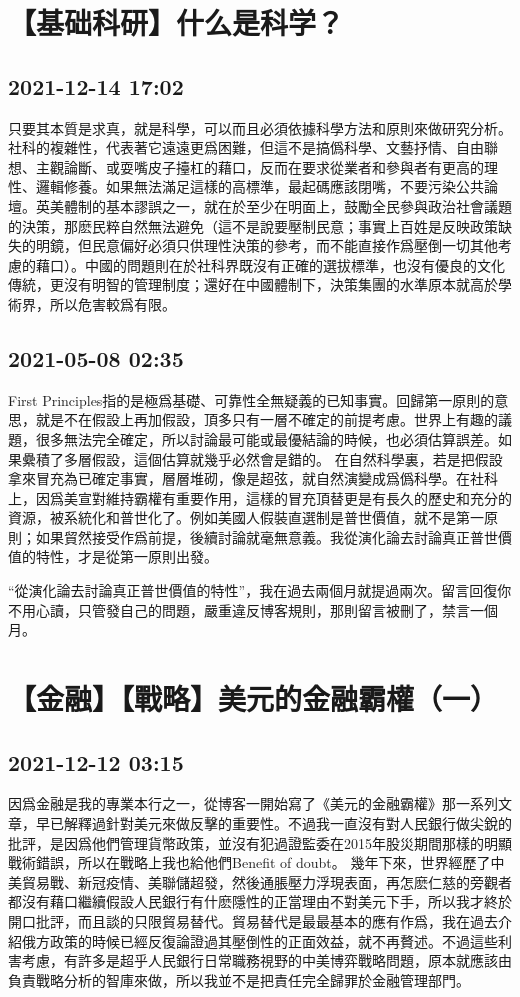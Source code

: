 \documentclass[twocolumn]{ctexart}
\begin{document}
\section*{【基础科研】什么是科学？}
\subsection*{2021-12-14 17:02}

只要其本質是求真，就是科學，可以而且必須依據科學方法和原則來做研究分析。社科的複雜性，代表著它遠遠更爲困難，但這不是搞僞科學、文藝抒情、自由聯想、主觀論斷、或耍嘴皮子擡杠的藉口，反而在要求從業者和參與者有更高的理性、邏輯修養。如果無法滿足這樣的高標準，最起碼應該閉嘴，不要污染公共論壇。英美體制的基本謬誤之一，就在於至少在明面上，鼓勵全民參與政治社會議題的決策，那麽民粹自然無法避免（這不是說要壓制民意；事實上百姓是反映政策缺失的明鏡，但民意偏好必須只供理性決策的參考，而不能直接作爲壓倒一切其他考慮的藉口）。中國的問題則在於社科界既沒有正確的選拔標準，也沒有優良的文化傳統，更沒有明智的管理制度；還好在中國體制下，決策集團的水準原本就高於學術界，所以危害較爲有限。
\subsection*{2021-05-08 02:35}

First Principles指的是極爲基礎、可靠性全無疑義的已知事實。回歸第一原則的意思，就是不在假設上再加假設，頂多只有一層不確定的前提考慮。世界上有趣的議題，很多無法完全確定，所以討論最可能或最優結論的時候，也必須估算誤差。如果纍積了多層假設，這個估算就幾乎必然會是錯的。
在自然科學裏，若是把假設拿來冒充為已確定事實，層層堆砌，像是超弦，就自然演變成爲僞科學。在社科上，因爲美宣對維持霸權有重要作用，這樣的冒充頂替更是有長久的歷史和充分的資源，被系統化和普世化了。例如美國人假裝直選制是普世價值，就不是第一原則；如果貿然接受作爲前提，後續討論就毫無意義。我從演化論去討論真正普世價值的特性，才是從第一原則出發。

“從演化論去討論真正普世價值的特性”，我在過去兩個月就提過兩次。留言回復你不用心讀，只管發自己的問題，嚴重違反博客規則，那則留言被刪了，禁言一個月。
\section*{【金融】【戰略】美元的金融霸權（一）}
\subsection*{2021-12-12 03:15}

因爲金融是我的專業本行之一，從博客一開始寫了《美元的金融霸權》那一系列文章，早已解釋過針對美元來做反擊的重要性。不過我一直沒有對人民銀行做尖銳的批評，是因爲他們管理貨幣政策，並沒有犯過證監委在2015年股災期間那樣的明顯戰術錯誤，所以在戰略上我也給他們Benefit of doubt。
幾年下來，世界經歷了中美貿易戰、新冠疫情、美聯儲超發，然後通脹壓力浮現表面，再怎麽仁慈的旁觀者都沒有藉口繼續假設人民銀行有什麽隱性的正當理由不對美元下手，所以我才終於開口批評，而且談的只限貿易替代。貿易替代是最最基本的應有作爲，我在過去介紹俄方政策的時候已經反復論證過其壓倒性的正面效益，就不再贅述。不過這些利害考慮，有許多是超乎人民銀行日常職務視野的中美博弈戰略問題，原本就應該由負責戰略分析的智庫來做，所以我並不是把責任完全歸罪於金融管理部門。
\end{document}
